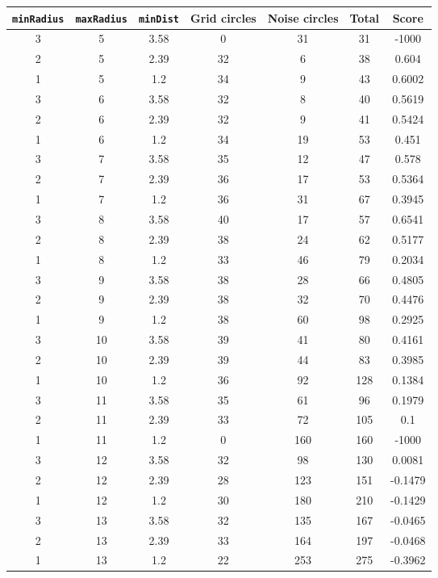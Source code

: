 \documentclass[letterpaper, 12pt]{article}
\begin{document}
\begin{longtable}{|c|c|c|c|c|c|c|}
\hline
\textbf{\texttt{minRadius}} & \textbf{\texttt{maxRadius}} & \textbf{\texttt{minDist}} & \textbf{Grid circles} & \textbf{Noise circles} & \textbf{Total} & \textbf{Score} \\
\hline
3 & 5 & 3.58 & 0 & 31 & 31 & -1000 \\
\hline
2 & 5 & 2.39 & 32 & 6 & 38 & 0.604 \\
\hline
1 & 5 & 1.2 & 34 & 9 & 43 & 0.6002 \\
\hline
3 & 6 & 3.58 & 32 & 8 & 40 & 0.5619 \\
\hline
2 & 6 & 2.39 & 32 & 9 & 41 & 0.5424 \\
\hline
1 & 6 & 1.2 & 34 & 19 & 53 & 0.451 \\
\hline
3 & 7 & 3.58 & 35 & 12 & 47 & 0.578 \\
\hline
2 & 7 & 2.39 & 36 & 17 & 53 & 0.5364 \\
\hline
1 & 7 & 1.2 & 36 & 31 & 67 & 0.3945 \\
\hline
3 & 8 & 3.58 & 40 & 17 & 57 & 0.6541 \\
\hline
2 & 8 & 2.39 & 38 & 24 & 62 & 0.5177 \\
\hline
1 & 8 & 1.2 & 33 & 46 & 79 & 0.2034 \\
\hline
3 & 9 & 3.58 & 38 & 28 & 66 & 0.4805 \\
\hline
2 & 9 & 2.39 & 38 & 32 & 70 & 0.4476 \\
\hline
1 & 9 & 1.2 & 38 & 60 & 98 & 0.2925 \\
\hline
3 & 10 & 3.58 & 39 & 41 & 80 & 0.4161 \\
\hline
2 & 10 & 2.39 & 39 & 44 & 83 & 0.3985 \\
\hline
1 & 10 & 1.2 & 36 & 92 & 128 & 0.1384 \\
\hline
3 & 11 & 3.58 & 35 & 61 & 96 & 0.1979 \\
\hline
2 & 11 & 2.39 & 33 & 72 & 105 & 0.1 \\
\hline
1 & 11 & 1.2 & 0 & 160 & 160 & -1000 \\
\hline
3 & 12 & 3.58 & 32 & 98 & 130 & 0.0081 \\
\hline
2 & 12 & 2.39 & 28 & 123 & 151 & -0.1479 \\
\hline
1 & 12 & 1.2 & 30 & 180 & 210 & -0.1429 \\
\hline
3 & 13 & 3.58 & 32 & 135 & 167 & -0.0465 \\
\hline
2 & 13 & 2.39 & 33 & 164 & 197 & -0.0468 \\
\hline
1 & 13 & 1.2 & 22 & 253 & 275 & -0.3962 \\

\end{longtable}
\end{document}
